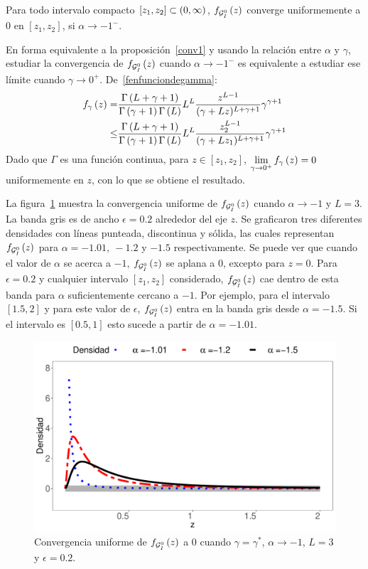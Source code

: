 \begin{proposition}
	\label{conv2}
	Para todo intervalo compacto $[z_{1},z_{2}]\subset\left( 0,\infty \right)$, $f_{\mathcal{G}_I^0}\left( z \right)$ converge
	uniformemente a $0$ en $[z_{1},z_{2}]$, si $\alpha\to -1^{-}$.
\end{proposition}
\begin{dem}
	En forma equivalente a la proposición~\ref{conv1} y usando la relación entre $\alpha$ y $\gamma$, estudiar la convergencia de $f_{\mathcal{G}_I^0}\left( z \right)$ cuando $\alpha\to -1^{-}$ es equivalente a estudiar ese límite cuando ${\gamma\to 0^{+}}$.
	De~\eqref{fenfunciondegamma}:
	\begin{align*}
	f_{\gamma}\left( z \right) = &\frac{\Gamma\left( L+\gamma+1 \right)}{\Gamma\left( \gamma+1 \right)\Gamma\left( L \right)}
	L^{L} \frac{z^{L-1}}{(\gamma+Lz)^{L+\gamma+1}} \gamma^{\gamma +1}  \\
	\leq& \frac{\Gamma\left( L+\gamma+1 \right)}{\Gamma\left( \gamma+1 \right)\Gamma\left( L \right)}
	L^{L} \frac{z_2^{L-1}}{(\gamma+Lz_1)^{L+\gamma+1}} \gamma^{\gamma +1} 
	\end{align*}
	Dado que $\Gamma$ es una función continua, para $z \in [z_{1},z_{2}]$, $\lim\limits_{\gamma\to0^+} f_{\gamma}\left( z \right)=0$ uniformemente en $z$, con lo que se obtiene el resultado.
\end{dem}

La figura~\ref{ConvEnCero} muestra la convergencia uniforme de $f_{\mathcal{G}_I^0}\left( z \right)$ cuando $\alpha \to -1$ y $L=3$. La banda gris es de ancho $\epsilon=0.2$ alrededor del eje $z$. 
Se graficaron tres diferentes densidades con líneas punteada, discontinua y sólida, las cuales representan $f_{\mathcal{G}_I^0}\left( z \right)$ para $\alpha=-1.01, \ -1.2$ y $-1.5$ respectivamente. 
Se puede ver que cuando el valor de $\alpha$ se acerca a $-1$, $f_{\mathcal{G}_I^0}\left( z \right)$ se aplana a $0$, excepto para $z=0$. 
Para  $\epsilon=0.2$ y cualquier intervalo $[z_1,z_2]$ considerado, $f_{\mathcal{G}_I^0}\left( z \right)$ cae dentro de esta banda para $\alpha$ suficientemente cercano a $-1$. 
Por ejemplo, para el intervalo $[1.5,2]$ y para este valor de $\epsilon$, $f_{\mathcal{G}_I^0}\left( z \right)$ entra en la banda gris desde $\alpha=-1.5$. 
Si el intervalo es $[0.5,1]$ esto sucede a partir de $\alpha=-1.01$.



\begin{figure}[hbt]
	\centering    
	\includegraphics[width=0.8\linewidth]{../../Figures/Tesis/Capitulo4/ConvUnifEnCero.pdf}
	\caption{\label{ConvEnCero}Convergencia uniforme de $f_{\mathcal{G}_I^0}\left( z \right)$ a $0$ cuando $\gamma=\gamma^*$, $\alpha \to -1$, $L=3$ y $\epsilon=0.2$.}
\end{figure}

